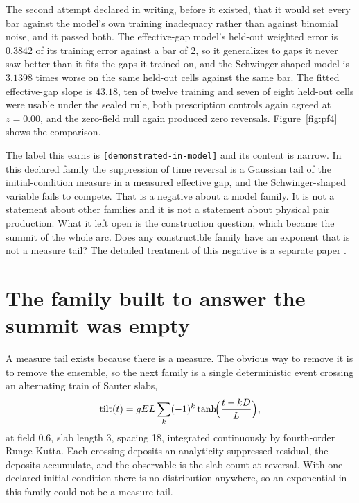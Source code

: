\documentclass[aps,pre,reprint,nofootinbib,floatfix]{revtex4-2}
\begin{document}
The second attempt declared in writing, before it existed, that it
would set every bar against the model's own training inadequacy rather
than against binomial noise, and it passed both.  The effective-gap
model's held-out weighted error is $0.3842$ of its training error
against a bar of 2, so it generalizes to gaps it never saw better than
it fits the gaps it trained on, and the Schwinger-shaped model is
$3.1398$ times worse on the same held-out cells against the same bar.
The fitted effective-gap slope is $43.18$, ten of twelve training and
seven of eight held-out cells were usable under the sealed rule, both
prescription controls again agreed at $z = 0.00$, and the zero-field
null again produced zero reversals.  Figure~\ref{fig:pf4} shows the
comparison.

The label this earns is \texttt{[demonstrated-in-model]} and its
content is narrow.  In this declared family the suppression of time
reversal is a Gaussian tail of the initial-condition measure in a
measured effective gap, and the Schwinger-shaped variable fails to
compete.  That is a negative about a model family.  It is not a
statement about other families and it is not a statement about physical
pair production.  What it left open is the construction question, which
became the summit of the whole arc.  Does any constructible family have
an exponent that is not a measure tail?  The detailed treatment of this
negative is a separate paper \cite{ZenodoSchwinger}.

\section{The family built to answer the summit was empty}
\label{sec:pf4b}

A measure tail exists because there is a measure.  The obvious way to
remove it is to remove the ensemble, so the next family is a single
deterministic event crossing an alternating train of Sauter slabs,
\begin{equation}
  \mathrm{tilt}(t) = g E L \sum_k (-1)^k
    \tanh\!\Bigl(\frac{t - kD}{L}\Bigr),
  \label{eq:train}
\end{equation}
at field $0.6$, slab length 3, spacing 18, integrated continuously by
fourth-order Runge-Kutta.  Each crossing deposits an
analyticity-suppressed residual, the deposits accumulate, and the
observable is the slab count at reversal.  With one declared initial
condition there is no distribution anywhere, so an exponential in this
family could not be a measure tail.
\end{document}
